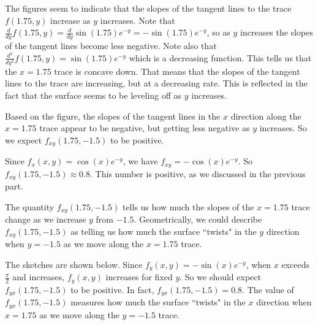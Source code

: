 \begin{smallhint}

\end{smallhint}
\begin{bighint}

\end{bighint}
\begin{activitySolution}
\ba
\item The figures seem to indicate that the slopes of the tangent lines to the trace $f(1.75,y)$ increase as $y$ increases. Note that $\frac{d}{dy} f(1.75,y) = \frac{d}{dy} \sin(1.75) e^{-y} = -\sin(1.75) e^{-y}$, so as $y$ increases the slopes of the tangent lines become less negative. Note also that $\frac{d^2}{dy^2} f(1.75,y) = \sin(1.75)e^{-y}$ which is a decreasing function. This tells us that the $x=1.75$ trace is concave down. That means that the slopes of the tangent lines to the trace are increasing, but at a decreasing rate. This is reflected in the fact that the surface seems to be leveling off as $y$ increases. 

\item Based on the figure, the slopes of the tangent lines in the $x$ direction along the $x=1.75$ trace appear to be negative, but getting less negative as $y$ increases. So we expect $f_{xy}(1.75,-1.5)$ to be positive.  

\item Since $f_x(x,y) = \cos(x)e^{-y}$, we have $f_{xy} = -\cos(x)e^{-y}$. So $f_{xy}(1.75,-1.5) \approx 0.8$. This number is positive, as we discussed in the previous part. 

\item The quantity $f_{xy}(1.75,-1.5)$ tells us how much the slopes of the $x=1.75$ trace change as we increase $y$ from $-1.5$. Geometrically, we could describe $f_{xy}(1.75,-1.5)$ as telling us how much the surface ``twists" in the $y$ direction when $y=-1.5$ as we move along the $x=1.75$ trace. 

\item The sketches are shown below. Since $f_y(x,y) = -\sin(x)e^{-y}$, when $x$ exceeds $\frac{\pi}{2}$ and increases, $f_y(x,y)$ increases for fixed $y$. So we should expect $f_{yx}(1.75,-1.5)$ to be positive. In fact, $f_{yx}(1.75,-1.5) = 0.8$. The value of $f_{yx}(1.75,-1.5)$ measures how much the surface ``twists" in the $x$ direction when $x=1.75$ as we move along the $y=-1.5$ trace.  


\end{activitySolution}
